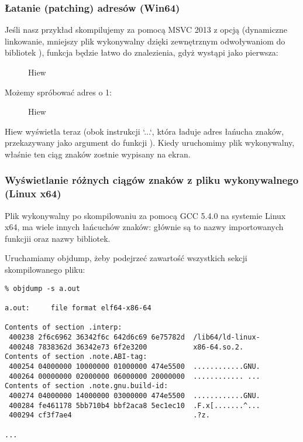 \subsubsection{Łatanie (patching) adresów (Win64)}

Jeśli nasz przykład skompilujemy za pomocą MSVC 2013 z opcją 
(dynamiczne linkowanie, mniejszy plik wykonywalny dzięki zewnętrznym odwoływaniom do bibliotek ),
funkcja \main będzie łatwo do znalezienia, gdyż wystąpi jako pierwsza:

\begin{figure}[H]
\centering
{}
\caption{Hiew}
\label{}
\end{figure}

Możemy spróbować  adres o 1:

\begin{figure}[H]
\centering
{}
\caption{Hiew}
\label{}
\end{figure}

Hiew wyświetla teraz  (obok instrukcji `\LEA \RCX ...`, która ładuje adres łańucha znaków, przekazywany jako argument do funkcji \printf).
Kiedy uruchomimy plik wykonywalny, właśnie ten ciąg znaków zostnie wypisany na ekran.

\subsubsection{Wyświetlanie różnych ciągów znaków z pliku wykonywalnego (Linux x64)}

Plik wykonywalny po skompilowaniu za pomocą GCC 5.4.0 na systemie Linux x64, ma wiele innych łańcuchów znaków:
głównie są to nazwy importowanych funkcjii oraz nazwy bibliotek.

Uruchamiamy objdump, żeby podejrzeć zawartość wszystkich sekcji skompilowanego pliku:

\begin{lstlisting}
% objdump -s a.out

a.out:     file format elf64-x86-64

Contents of section .interp:
 400238 2f6c6962 36342f6c 642d6c69 6e75782d  /lib64/ld-linux-
 400248 7838362d 36342e73 6f2e3200           x86-64.so.2.
Contents of section .note.ABI-tag:
 400254 04000000 10000000 01000000 474e5500  ............GNU.
 400264 00000000 02000000 06000000 20000000  ............ ...
Contents of section .note.gnu.build-id:
 400274 04000000 14000000 03000000 474e5500  ............GNU.
 400284 fe461178 5bb710b4 bbf2aca8 5ec1ec10  .F.x[.......^...
 400294 cf3f7ae4                             .?z.

...
\end{lstlisting}

